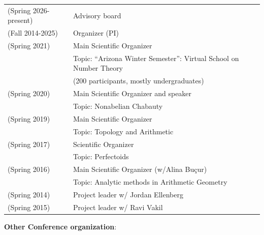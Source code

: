 \documentclass[margin,line]{res}
\newcommand{\defi}[1]{\textsf{#1}} 				%
\begin{document}
\begin{resume}
\begin{tabular}{ll}
  (Spring 2026-present) & Advisory board   \\
  (Fall 2014-2025) & Organizer (PI)\\  
  (Spring 2021) & Main Scientific Organizer  \\
                     &Topic:  \defi{``Arizona Winter Semester'': Virtual School on Number Theory}\\
                        &(200 participants, mostly undergraduates) \\
  (Spring 2020) & Main Scientific Organizer and speaker \\
  &Topic:  \defi{Nonabelian Chabauty} \\
  (Spring 2019) & Main Scientific Organizer \\
  & Topic: \defi{Topology and Arithmetic} \\
  (Spring 2017) & Scientific Organizer \\
&   Topic: Perfectoids \\
  (Spring 2016) & Main Scientific Organizer (w/Alina Bu\c cur)\\
  &  Topic:     \defi{Analytic methods in Arithmetic Geometry}\\
 (Spring 2014) & Project leader w/ \defi{Jordan Ellenberg}  \\
 (Spring 2015) & Project leader w/ \defi{Ravi Vakil}  \\
\end{tabular}


  \textbf{Other Conference organization}:
  \vspace*{-.15in}
  

\end{resume}
\end{document}
